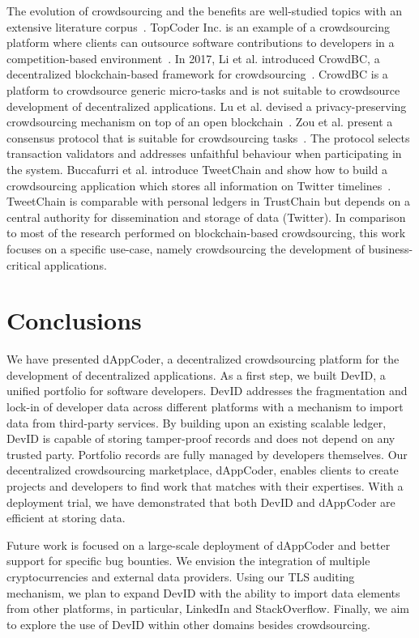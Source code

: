 The evolution of crowdsourcing and the benefits are well-studied topics with an extensive literature corpus~\cite{latoza2016crowdsourcing}.
TopCoder Inc. is an example of a crowdsourcing platform where clients can outsource software contributions to developers in a competition-based environment~\cite{lakhani2010topcoder}.
In 2017, Li et al. introduced CrowdBC, a decentralized blockchain-based framework for crowdsourcing~\cite{li2018crowdbc}.
CrowdBC is a platform to crowdsource generic micro-tasks and is not suitable to crowdsource development of decentralized applications.
Lu et al. devised a privacy-preserving crowdsourcing mechanism on top of an open blockchain~\cite{lu2018zebralancer}.
Zou et al. present a consensus protocol that is suitable for crowdsourcing tasks~\cite{zou2018proof}.
The protocol selects transaction validators and addresses unfaithful behaviour when participating in the system.
Buccafurri et al. introduce TweetChain and show how to build a crowdsourcing application which stores all information on Twitter timelines~\cite{buccafurri2017tweetchain}.
TweetChain is comparable with personal ledgers in TrustChain but depends on a central authority for dissemination and storage of data (Twitter).
In comparison to most of the research performed on blockchain-based crowdsourcing, this work focuses on a specific use-case, namely crowdsourcing the development of business-critical applications.

\section{Conclusions}
We have presented dAppCoder, a decentralized crowdsourcing platform for the development of decentralized applications.
As a first step, we built DevID, a unified portfolio for software developers.
DevID addresses the fragmentation and lock-in of developer data across different platforms with a mechanism to import data from third-party services.
By building upon an existing scalable ledger, DevID is capable of storing tamper-proof records and does not depend on any trusted party.
Portfolio records are fully managed by developers themselves.
Our decentralized crowdsourcing marketplace, dAppCoder, enables clients to create projects and developers to find work that matches with their expertises.
With a deployment trial, we have demonstrated that both DevID and dAppCoder are efficient at storing data.

Future work is focused on a large-scale deployment of dAppCoder and better support for specific bug bounties.
We envision the integration of multiple cryptocurrencies and external data providers.
Using our TLS auditing mechanism, we plan to expand DevID with the ability to import data elements from other platforms, in particular, LinkedIn and StackOverflow.
Finally, we aim to explore the use of DevID within other domains besides crowdsourcing.